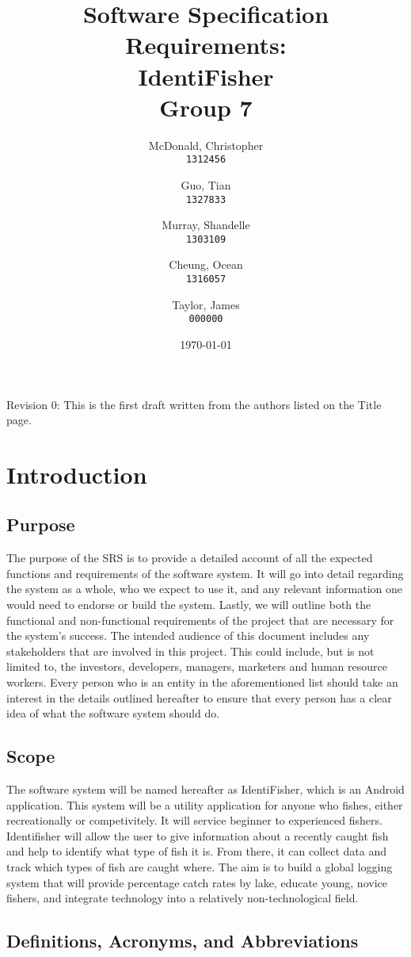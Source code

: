 \documentclass{article}
\title{Software Specification Requirements: \\ IdentiFisher \\ Group 7}
\author{
McDonald, Christopher\\
\texttt{1312456}
\and
Guo, Tian\\
\texttt{1327833}
\and
Murray, Shandelle\\
\texttt{1303109}
\and
Cheung, Ocean\\
\texttt{1316057}
\and
Taylor, James\\
\texttt{000000}
}
\date{\today}
\begin{document}
\maketitle

\newpage
\tableofcontents
Revision 0: This is the first draft written from the authors listed on the Title page.
\newpage
\section{Introduction}

\subsection{Purpose}
The purpose of the SRS is to provide a detailed account of all the expected functions
and requirements of the software system. It will go into detail regarding the system
as a whole, who we expect to use it, and any relevant information one would need
to endorse or build the system. Lastly, we will outline both the functional and
non-functional requirements of the project that are necessary for the system's
success. The intended audience of this document includes any stakeholders that are involved in this
project. This could include, but is not limited to, the investors, developers, managers,
marketers and human resource workers. Every person who is an entity in the aforementioned
list should take an interest in the details outlined hereafter to ensure that every person
has a clear idea of what the software system should do.

\subsection{Scope}
The software system will be named hereafter as IdentiFisher, which is an Android application.
This system will be a utility application for anyone who fishes, either recreationally or
competivitely. It will service beginner to experienced fishers. Identifisher will allow
the user to give information about a recently caught fish and help to identify what type
of fish it is. From there, it can collect data and track which types of fish are caught where. The aim is to
build a global logging system that will provide percentage catch rates by lake,
educate young, novice fishers, and integrate technology into a relatively non-technological field.


\subsection{Definitions, Acronyms, and Abbreviations}
\end{document}
